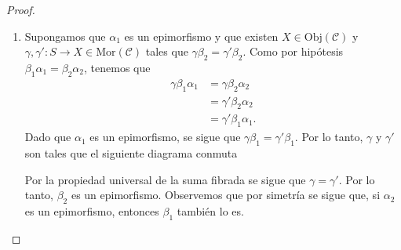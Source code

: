 \documentclass[tesis]{subfiles}
\begin{document}
\begin{proof}\leavevmode
    \begin{enumerate}[label=(\alph*)]

        \item Supongamos que $\alpha_1$ es un epimorfismo y que existen $X\in\text{Obj}(\mathscr{C})$ y $\gamma,\gamma':S\to X\in\text{Mor}(\mathscr{C})$ tales que $\gamma\beta_2 = \gamma'\beta_2$. Como por hipótesis $\beta_1\alpha_1=\beta_2\alpha_2$, tenemos que
            \begin{align*}
                \gamma\beta_1\alpha_1 &= \gamma\beta_2\alpha_2 \\
                                        &= \gamma'\beta_2\alpha_2 \\
                                        &= \gamma'\beta_1\alpha_1.
            \end{align*}
            Dado que $\alpha_1$ es un epimorfismo, se sigue que $\gamma\beta_1 = \gamma'\beta_1$. Por lo tanto, $\gamma$ y $\gamma'$ son tales que el siguiente diagrama conmuta
    \begin{center}
    \end{center}
            Por la propiedad universal de la suma fibrada se sigue que $\gamma=\gamma'$. Por lo tanto, $\beta_2$ es un epimorfismo. Observemos que por simetría se sigue que, si $\alpha_2$ es un epimorfismo, entonces $\beta_1$ también lo es.


\end{enumerate}
\end{proof}
\end{document}
